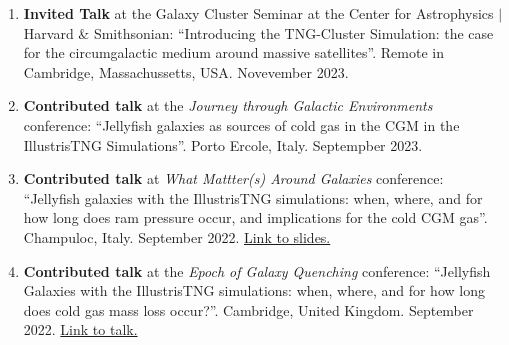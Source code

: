 \documentclass[a4paper,10pt,oneside]{article}
\begin{document}
\begin{enumerate}[wide, labelwidth=!, labelindent=-11pt, parsep=0pt]
    \item {\bf Invited Talk} at the Galaxy Cluster Seminar at the Center for Astrophysics $\vert$ Harvard \& Smithsonian: ``Introducing the TNG-Cluster Simulation: the case for the circumgalactic medium around massive satellites''. Remote in Cambridge, Massachussetts, USA. Novevember 2023. 
    \item {\bf Contributed talk} at the {\it Journey through Galactic Environments} conference: ``Jellyfish galaxies as sources of cold gas in the CGM in the IllustrisTNG Simulations''. Porto Ercole, Italy. Septempber 2023.
    \item {\bf Contributed talk} at {\it What Mattter(s) Around Galaxies} conference: ``Jellyfish galaxies with the IllustrisTNG simulations: when, where, and for how long does ram pressure occur, and implications for the cold CGM gas''. Champuloc, Italy. September 2022. \href{https://drive.google.com/file/u/0/d/1x4FNVCmUWTFwznOAs9RYhLwkKl-kmhZT/view?usp=drive_web}{Link to slides.}
    \item {\bf Contributed talk} at the {\it Epoch of Galaxy Quenching} conference: ``Jellyfish Galaxies with the IllustrisTNG simulations: when, where, and for how long does cold gas mass loss occur?''. Cambridge, United Kingdom. September 2022. \href{https://sites.google.com/cam.ac.uk/quenching/programme#h.ohkoyw4ilbje}{Link to talk.}

\end{enumerate}
\end{document}
